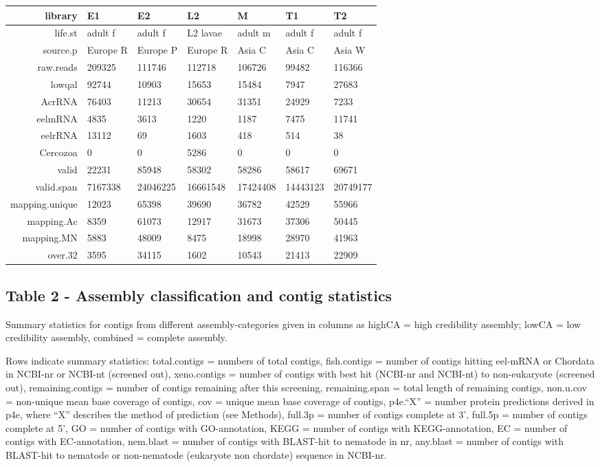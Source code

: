 \documentclass[10pt]{bmc_article}
\newenvironment{bmcformat}{\begin{raggedright}\baselineskip20pt\sloppy\setboolean{publ}{false}}{\end{raggedright}\baselineskip20pt\sloppy}
\begin{document}
\begin{bmcformat}
\begin{tabular}{rllllll}
   \hline
library & E1 & E2 & L2 & M & T1 & T2 \\ 
   \hline
life.st & adult f & adult f & L2 lavae & adult m & adult f & adult f \\ 
  source.p & Europe R & Europe P & Europe R & Asia C & Asia C & Asia W \\ 
  raw.reads & 209325 & 111746 & 112718 & 106726 & 99482 & 116366 \\ 
  lowqal & 92744 & 10903 & 15653 & 15484 & 7947 & 27683 \\ 
  AcrRNA & 76403 & 11213 & 30654 & 31351 & 24929 & 7233 \\ 
   \hline
eelmRNA & 4835 & 3613 & 1220 & 1187 & 7475 & 11741 \\ 
  eelrRNA & 13112 & 69 & 1603 & 418 & 514 & 38 \\ 
  Cercozoa & 0 & 0 & 5286 & 0 & 0 & 0 \\ 
  valid & 22231 & 85948 & 58302 & 58286 & 58617 & 69671 \\ 
  valid.span & 7167338 & 24046225 & 16661548 & 17424408 & 14443123 & 20749177 \\ 
  mapping.unique & 12023 & 65398 & 39690 & 36782 & 42529 & 55966 \\ 
  mapping.Ac &  8359 & 61073 & 12917 & 31673 & 37306 & 50445 \\ 
  mapping.MN &  5883 & 48009 &  8475 & 18998 & 28970 & 41963 \\ 
  over.32 &  3595 & 34115 &  1602 & 10543 & 21413 & 22909 \\ 
  \end{tabular}
\subsection*{Table 2 - Assembly classification and contig statistics}

Summary statistics for contigs from different assembly-categories
given in columns as highCA = high credibility assembly; lowCA = low
credibility assembly, combined = complete assembly.

Rows indicate summary statistics: total.contigs = numbers of total
contigs, fish.contigs = number of contigs hitting eel-mRNA or Chordata
in NCBI-nr or NCBI-nt (screened out), xeno.contigs = number of contigs
with best hit (NCBI-nr and NCBI-nt) to non-eukaryote (screened out),
remaining.contigs = number of contigs remaining after this screening,
remaining.span = total length of remaining contigs, non.u.cov =
non-unique mean base coverage of contigs, cov = unique mean base
coverage of contigs, p4e.``X'' = number protein predictions derived in
p4e, where ``X'' describes the method of prediction (see Methods),
full.3p = number of contigs complete at 3', full.5p = number of
contigs complete at 5', GO = number of contigs with GO-annotation,
KEGG = number of contigs with KEGG-annotation, EC = number of contigs
with EC-annotation, nem.blast = number of contigs with BLAST-hit to
nematode in nr, any.blast = number of contigs with BLAST-hit to
nematode or non-nematode (eukaryote non chordate) sequence in NCBI-nr.



\end{bmcformat}
\end{document}
